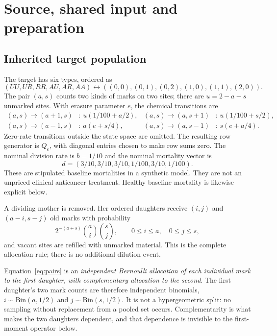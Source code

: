 \section{Source, shared input and preparation}\label{sec:model}
\subsection{Inherited target population}
The target has six types, ordered as
\[
 (UU,UR,RR,AU,AR,AA)
 \longleftrightarrow ((0,0),(0,1),(0,2),(1,0),(1,1),(2,0)).
\]
The pair $(a,s)$ counts two kinds of marks on two sites; there are $u=2-a-s$ unmarked sites. With erasure parameter $e$, the chemical transitions are
\begin{align}\label{eq:chemistry}
 (a,s)\to(a+1,s)&:\ u(1/100+a/2),&
 (a,s)\to(a,s+1)&:\ u(1/100+s/2),\nonumber\\
 (a,s)\to(a-1,s)&:\ a(e+s/4),&
 (a,s)\to(a,s-1)&:\ s(e+a/4).
\end{align}
Zero-rate transitions outside the state space are omitted. The resulting row generator is $Q_e$, with diagonal entries chosen to make row sums zero. The nominal division rate is $b=1/10$ and the nominal mortality vector is
\begin{equation}\label{eq:deaths}
 d=(3/10,3/10,3/10,1/100,3/10,1/100).
\end{equation}
These are stipulated baseline mortalities in a synthetic model. They are not an unpriced clinical anticancer treatment. Healthy baseline mortality is likewise explicit below.

A dividing mother is removed. Her ordered daughters receive $(i,j)$ and $(a-i,s-j)$ old marks with probability
\begin{equation}\label{eq:pairs}
 2^{-(a+s)}\binom ai\binom sj,
 \qquad 0\le i\le a,\quad 0\le j\le s,
\end{equation}
and vacant sites are refilled with unmarked material. This is the complete allocation rule; there is no additional dilution event.

\begin{remark}\label{rem:binomial}
Equation~\eqref{eq:pairs} is an \emph{independent Bernoulli allocation of each individual mark to the first daughter, with complementary allocation to the second}. The first daughter's two mark counts are therefore independent binomials, $i\sim\mathrm{Bin}(a,1/2)$ and $j\sim\mathrm{Bin}(s,1/2)$. It is not a hypergeometric split: no sampling without replacement from a pooled set occurs. Complementarity is what makes the two daughters dependent, and that dependence is invisible to the first-moment operator below.
\end{remark}

